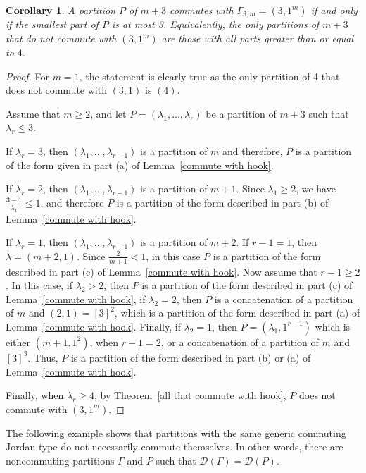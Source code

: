 \documentclass[11pt]{amsproc}
\newtheorem{cor}[thm]{Corollary}
\begin{document}
\begin{cor}
    A partition $P$ of $m+3$ commutes with $\Gamma_{3,m} =\left(3,1^m\right)$ if and only if the smallest part of $P$ is at most 3. Equivalently, the only partitions of $m+3$ that do not commute with $(3,1^m)$ are those with all parts greater than or equal to $4$.
\end{cor}
\begin{proof}
For $m=1$, the statement is clearly true as the only partition of 4 that does not commute with $(3,1)$ is $(4)$. 

Assume that $m\geq 2$, and let $P=(\lambda_1, \ldots, \lambda_r)$ be a partition of $m+3$ such that $\lambda_r\leq 3$. 
     
     If $\lambda_r=3$, then $(\lambda_1, \ldots, \lambda_{r-1})$ is a partition of $m$ and therefore, $P$ is a partition of the form given in part (a) of Lemma~\ref{commute with hook}.
     
     If $\lambda_r=2$, then $(\lambda_1, \ldots, \lambda_{r-1})$ is a partition of $m+1$. Since $\lambda_1\geq 2$, we have $\frac{3-1}{\lambda_1}\leq 1$, and therefore $P$ is a partition of the form described in part (b) of  Lemma~\ref{commute with hook}.
     
       If $\lambda_r=1$, then $(\lambda_1, \ldots, \lambda_{r-1})$ is a partition of $m+2$. If $r-1=1$, then $\lambda=(m+2,1)$. Since  $\frac{2}{m+1}<1$, in this case $P$ is a partition of the form described in part (c) of  Lemma~\ref{commute with hook}. Now assume that $r-1\geq 2$. In this case, if $\lambda_2> 2$, then $P$ is a partition of the form described in part (c) of  Lemma~\ref{commute with hook}, if $\lambda_2=2$, then $P$ is a concatenation of a partition of $m$ and $(2,1)=[3]^2$, which is a partition of the form described in part (a) of Lemma~\ref{commute with hook}. Finally, if $\lambda_2=1$, then $P=(\lambda_1, 1^{r-1})$ which is either $(m+1,1^2)$, when $r-1=2$, or a concatenation of a partition of $m$ and $[3]^3$. Thus, $P$ is a partition of the form described in part (b) or (a) of Lemma~\ref{commute with hook}. 
       
 
 Finally, when $\lambda_r \geq 4$, by Theorem~\ref{all that commute with hook},  $P$ does not commute with $(3,1^m)$.
\end{proof}


The following example shows that partitions with the same generic commuting Jordan type do not necessarily commute themselves. In other words, there are noncommuting partitions $\Gamma$ and $P$ such that $\mathcal{D}(\Gamma)=\mathcal{D}(P)$.
\end{document}
